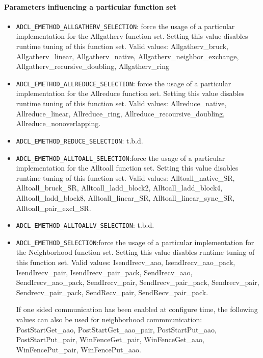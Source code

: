 \paragraph{Parameters influencing a particular function set}
\begin{itemize}
\item{\tt ADCL\_EMETHOD\_ALLGATHERV\_SELECTION}: force the usage of a particular
  implementation for the Allgatherv function set. Setting this value
  disables runtime tuning of this function set. Valid values: Allgatherv\_bruck, Allgatherv\_linear,
  Allgatherv\_native, Allgatherv\_neighbor\_exchange,
  Allgatherv\_recursive\_doubling, Allgatherv\_ring

\item{\tt ADCL\_EMETHOD\_ALLREDUCE\_SELECTION}: force the usage of a
  particular implementation for the Allreduce function set. Setting this value
  disables runtime tuning of this function set. Valid values:
  Allreduce\_native, Allreduce\_linear, Allreduce\_ring,
  Allreduce\_recoursive\_doubling, Allreduce\_nonoverlapping.

\item{\tt ADCL\_EMETHOD\_REDUCE\_SELECTION}: t.b.d.

\item{\tt ADCL\_EMETHOD\_ALLTOALL\_SELECTION}:force the usage of a
  particular implementation for the Alltoall function set. Setting this value
  disables runtime tuning of this function set. Valid values:
  Alltoall\_native\_SR, Alltoall\_bruck\_SR, Alltoall\_ladd\_block2,
  Alltoall\_ladd\_block4, Alltoall\_ladd\_block8, Alltoall\_linear\_SR,
  Alltoall\_linear\_sync\_SR, Alltoall\_pair\_excl\_SR.

\item{\tt ADCL\_EMETHOD\_ALLTOALLV\_SELECTION}: t.b.d.

\item {\tt ADCL\_EMETHOD\_SELECTION}:force the usage of a particular
  implementation for the Neighborhood function set. Setting this value
  disables runtime tuning of this function set. Valid values: IsendIrecv\_aao,
  IsendIrecv\_aao\_pack, IsendIrecv\_pair, IsendIrecv\_pair\_pack,
  SendIrecv\_aao, SendIrecv\_aao\_pack, SendIrecv\_pair, SendIrecv\_pair\_pack,
  Sendrecv\_pair, Sendrecv\_pair\_pack, SendRecv\_pair,
  SendRecv\_pair\_pack. 

  If one sided communication has been enabled at configure time, the following
  values can also be used for neighborhood commmunication: PostStartGet\_aao,
  PostStartGet\_aao\_pair, PostStartPut\_aao, PostStartPut\_pair,
  WinFenceGet\_pair, WinFenceGet\_aao, WinFencePut\_pair, WinFencePut\_aao.
 

\end{itemize}
